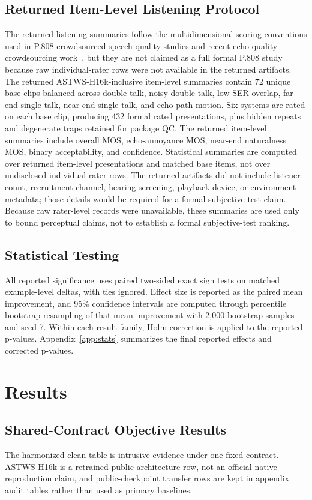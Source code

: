\documentclass[journal]{IEEEtran}
\begin{document}
\subsection{Returned Item-Level Listening Protocol}
The returned listening summaries follow the multidimensional scoring conventions used in P.808 crowdsourced speech-quality studies and recent echo-quality crowdsourcing work~\cite{p8082021,naderi2020p808,cutler2021echocrowd}, but they are not claimed as a full formal P.808 study because raw individual-rater rows were not available in the returned artifacts. The returned ASTWS-H16k-inclusive item-level summaries contain 72 unique base clips balanced across double-talk, noisy double-talk, low-SER overlap, far-end single-talk, near-end single-talk, and echo-path motion. Six systems are rated on each base clip, producing 432 formal rated presentations, plus hidden repeats and degenerate traps retained for package QC. The returned item-level summaries include overall MOS, echo-annoyance MOS, near-end naturalness MOS, binary acceptability, and confidence. Statistical summaries are computed over returned item-level presentations and matched base items, not over undisclosed individual rater rows. The returned artifacts did not include listener count, recruitment channel, hearing-screening, playback-device, or environment metadata; those details would be required for a formal subjective-test claim. Because raw rater-level records were unavailable, these summaries are used only to bound perceptual claims, not to establish a formal subjective-test ranking.

\subsection{Statistical Testing}
All reported significance uses paired two-sided exact sign tests on matched example-level deltas, with ties ignored. Effect size is reported as the paired mean improvement, and 95\% confidence intervals are computed through percentile bootstrap resampling of that mean improvement with 2,000 bootstrap samples and seed 7. Within each result family, Holm correction is applied to the reported p-values. Appendix~\ref{app:stats} summarizes the final reported effects and corrected p-values.

\section{Results}
\subsection{Shared-Contract Objective Results}
The harmonized clean table is intrusive evidence under one fixed contract. ASTWS-H16k is a retrained public-architecture row, not an official native reproduction claim, and public-checkpoint transfer rows are kept in appendix audit tables rather than used as primary baselines.
\end{document}
